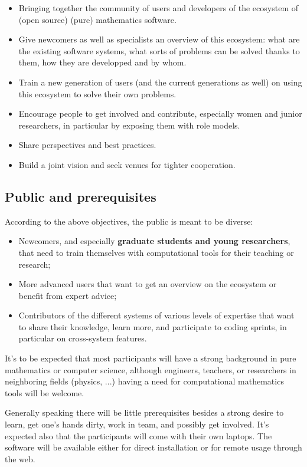 \documentclass[12pt]{amsart}
\begin{document}
\begin{itemize}
\item Bringing together the community of users and developers of the
  ecosystem of (open source) (pure) mathematics software.
\item Give newcomers as well as specialists an overview of this
  ecosystem: what are the existing software systems, what sorts of
  problems can be solved thanks to them, how they are developped and
  by whom.
\item Train a new generation of users (and the current generations as
  well) on using this ecosystem to solve their own problems.
\item Encourage people to get involved and contribute, especially
  women and junior researchers, in particular by exposing them with role models.
\item Share perspectives and best practices. 
\item Build a joint vision and
  seek venues for tighter cooperation.
\end{itemize}

\subsection{Public and prerequisites}

According to the above objectives, the public is meant to be diverse:
\begin{itemize}
\item Newcomers, and especially \textbf{graduate students and young
    researchers}, that need to train themselves with computational
  tools for their teaching or research;
\item More advanced users that want to get an overview on the
  ecosystem or benefit from expert advice;
\item Contributors of the different systems of various levels of
  expertise that want to share their knowledge, learn more, and
  participate to coding sprints, in particular on cross-system
  features.
\end{itemize}

It's to be expected that most participants will have a strong
background in pure mathematics or computer science, although
engineers, teachers, or researchers in neighboring fields (physics,
...) having a need for computational mathematics tools will be
welcome.

Generally speaking there will be little prerequisites besides a strong
desire to learn, get one's hands dirty, work in team, and possibly get
involved. It's expected also that the participants will come with
their own laptops. The software will be available either for direct
installation or for remote usage through the web.
\end{document}
